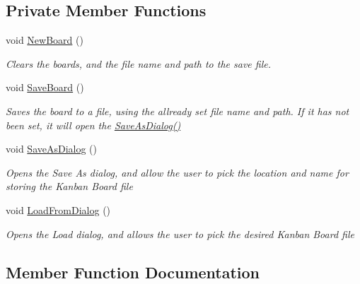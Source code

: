 \subsection*{Private Member Functions}
\begin{DoxyCompactItemize}
\item 
void \hyperlink{class_kanban_board_1_1_view_model_1_1_main_view_model_a7762a9f2331ec0b68d773570ac185ffc}{New\+Board} ()
\begin{DoxyCompactList}\small\item\em Clears the boards, and the file name and path to the save file. \end{DoxyCompactList}\item 
void \hyperlink{class_kanban_board_1_1_view_model_1_1_main_view_model_aa9116851f4b8e55c05045900745e4c39}{Save\+Board} ()
\begin{DoxyCompactList}\small\item\em Saves the board to a file, using the allready set file name and path. If it has not been set, it will open the \hyperlink{class_kanban_board_1_1_view_model_1_1_main_view_model_abdee48fdc9e1e61ffe046dc1d13c59dd}{Save\+As\+Dialog()} \end{DoxyCompactList}\item 
void \hyperlink{class_kanban_board_1_1_view_model_1_1_main_view_model_abdee48fdc9e1e61ffe046dc1d13c59dd}{Save\+As\+Dialog} ()
\begin{DoxyCompactList}\small\item\em Opens the Save As dialog, and allow the user to pick the location and name for storing the Kanban Board file \end{DoxyCompactList}\item 
void \hyperlink{class_kanban_board_1_1_view_model_1_1_main_view_model_aeb9121b810fcc08bc9fbcc26c02092b5}{Load\+From\+Dialog} ()
\begin{DoxyCompactList}\small\item\em Opens the Load dialog, and allows the user to pick the desired Kanban Board file \end{DoxyCompactList}\end{DoxyCompactItemize}


\subsection{Member Function Documentation}
\hypertarget{class_kanban_board_1_1_view_model_1_1_main_view_model_add23d90d0faec4c4d77bb3762d0215c7}{}
